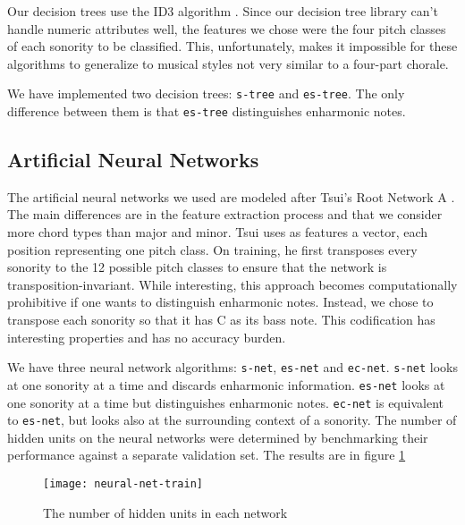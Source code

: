 \documentclass{article}
\newcommand{\comment}[1]{}
\begin{document}
\comment{
  ==> ID3 algorithm
  ==> features: sequência de pitches
  ==> dependência em quatro vozes 
}

Our decision trees use the ID3 algorithm
\cite{mitchell:machine}. Since our decision tree library can't handle
numeric attributes well, the features we chose were the four pitch
classes of each sonority to be classified. This, unfortunately,
makes it impossible for these algorithms to generalize to musical
styles not very similar to a four-part chorale.

We have implemented two decision trees: \texttt{s-tree} and
\texttt{es-tree}. The only difference between them is that
\texttt{es-tree} distinguishes enharmonic notes.

\subsection{Artificial Neural Networks}
\label{sec:neural-net}

\comment{
  ==> features são weighted pitch counts
  ==> simple/enharmonic-simple/context
  ==> mostrar gráfico de hidden units
}

The artificial neural networks we used are modeled after Tsui's Root
Network A \cite{tsui:harmonic}. The main differences are in the
feature extraction process and that we consider more chord types than
major and minor. Tsui \cite{tsui:harmonic} uses as features a vector,
each position representing one pitch class. On training, he first
transposes every sonority to the 12 possible pitch classes to ensure
that the network is transposition-invariant. While interesting, this
approach becomes computationally prohibitive if one wants to
distinguish enharmonic notes. Instead, we chose to transpose each
sonority so that it has C as its bass note. This codification has
interesting properties and has no accuracy burden.

We have three neural network algorithms: \texttt{s-net},
\texttt{es-net} and \texttt{ec-net}. \texttt{s-net} looks at one
sonority at a time and discards enharmonic information. \texttt{es-net}
looks at one sonority at a time but distinguishes enharmonic
notes. \texttt{ec-net} is equivalent to \texttt{es-net}, but looks
also at the surrounding context of a sonority. The number of hidden
units on the neural networks were determined by benchmarking their
performance against a separate validation set. The results are in
figure \ref{fig:hidden-units}

\begin{figure}
  \centering
  \texttt{[image: neural-net-train]}
  \caption{The number of hidden units in each network}
  \label{fig:hidden-units}
\end{figure}
\end{document}
